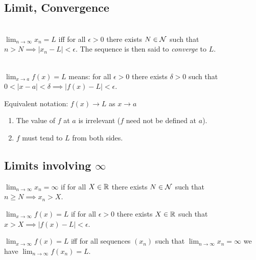 \subsection{Limit, Convergence}

\begin{definition*}~\\
  $\lim_{n \to \infty} x_n = L$ iff for all $\epsilon > 0$ there exists $N \in \mathcal{N}$ such that
  $n > N \implies |x_n - L| < \epsilon$. The sequence is then said to \textit{converge} to $L$.
\end{definition*}

\begin{definition*}~\\
  $\lim_{x \to a} f(x) = L$ means: for all $\epsilon > 0$ there exists $\delta > 0$ such that
  $0 < |x - a| < \delta \implies |f(x) - L| < \epsilon$.
\end{definition*}

Equivalent notation: $f(x) \to L$ as $x \to a$

\begin{remark*}\hspace{0pt}
  \begin{enumerate}
  \item The value of $f$ at $a$ is irrelevant ($f$ need not be defined at $a$).
  \item $f$ must tend to $L$ from both sides.
  \end{enumerate}
\end{remark*}

\subsection{Limits involving $\infty$}

\begin{definition*}
  $\lim_{n \to \infty} x_n = \infty$ if for all $X \in \mathbb{R}$ there exists $N \in \mathcal{N}$ such that
  $n \geq N \implies x_n > X$.
\end{definition*}

\begin{definition*}
  $\lim_{x \to \infty} f(x) = L$ if for all $\epsilon > 0$ there exists $X \in \mathbb{R}$ such that
  $x > X \implies |f(x) - L| < \epsilon$.
\end{definition*}

\begin{theorem*}
  $\lim_{x \to \infty} f(x) = L$ iff for all sequences $(x_n)$ such that
  $\lim_{n \to \infty}x_n = \infty$ we have $\lim_{n \to \infty} f(x_n) = L$.
\end{theorem*}

